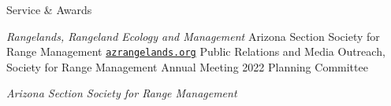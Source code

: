 \begin{rubric}{Service \& Awards}

    \emph{Rangelands, Rangeland Ecology and Management}
%
    Arizona Section Society for Range Management {\faGlobe}{\href{https://azrangelands.org/}{\texttt{azrangelands.org}}}
%
    Public Relations and Media Outreach, Society for Range Management Annual Meeting 2022 Planning Committee

    \emph{Arizona Section Society for Range Management}
\end{rubric}